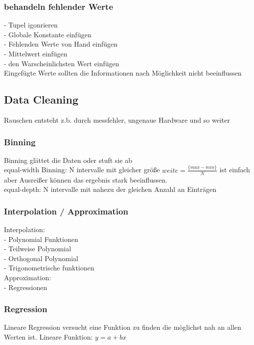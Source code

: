 \documentclass[a4paper]{scrartcl}
\begin{document}
\subsubsection{behandeln fehlender Werte}
- Tupel igonrieren\\
- Globale Konstante einfügen\\
- Fehlenden Werte von Hand einfügen\\
- Mittelwert einfügen\\
- den Warscheinlichsten Wert einfügen\\

Eingefügte Werte sollten die Informationen nach Möglichkeit nicht beeinflussen\\

\subsection{Data Cleaning}
Rauschen entsteht z.b. durch messfehler, ungenaue Hardware und so weiter\\

\subsubsection{Binning}
Binning glättet die Daten oder stuft sie ab\\

equal-width Binning: N intervalle mit gleicher größe $weite = \frac{\{max-min\}}{N}$ ist einfach aber Ausreißer können das ergebnis stark beeinflussen.\\

equal-depth: N intervalle mit nahezu der gleichen Anzahl an Einträgen\\

\subsubsection{Interpolation / Approximation}

Interpolation: \\
- Polynomial Funktionen\\
- Teilweise Polynomial\\
- Orthogonal Polynomial\\
- Trigonometrische funktionen\\

Approximation:\\
- Regressionen\\

\subsubsection{Regression}
Lineare Regression versucht eine Funktion zu finden die möglichst nah an allen Werten ist. Lineare Funktion:
$y = a + bx$\\
\end{document}

